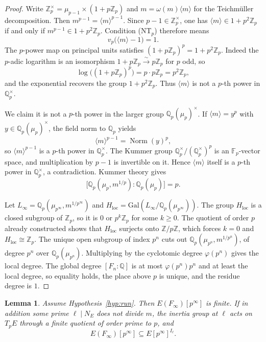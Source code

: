 \documentclass[11pt]{article}
\newtheorem{lemma}[theorem]{Lemma}
\theoremstyle{definition}
\theoremstyle{remark}
\newcommand{\Z}{\mathbb{Z}}
\newcommand{\Q}{\mathbb{Q}}
\newcommand{\F}{\mathbb{F}}
\newcommand{\Gal}{\mathrm{Gal}}
\newcommand{\Norm}{\operatorname{Norm}}
\begin{document}
\begin{proof}
Write \(\Z_p^\times=\mu_{p-1}\times(1+p\Z_p)\) and \(m=\omega(m)\langle m\rangle\) for the Teichm\"uller decomposition. Then \(m^{p-1}=\langle m\rangle^{p-1}\). Since \(p-1\in\Z_p^\times\), one has \(\langle m\rangle\in 1+p^2\Z_p\) if and only if \(m^{p-1}\in 1+p^2\Z_p\). Condition (NT\(_p\)) therefore means
\[
v_p\bigl(\langle m\rangle-1\bigr)=1.
\]
The \(p\)-power map on principal units satisfies \((1+p\Z_p)^p=1+p^2\Z_p\). Indeed the \(p\)-adic logarithm is an isomorphism \(1+p\Z_p\xrightarrow{\sim}p\Z_p\) for \(p\) odd, so
\[
\log\bigl((1+p\Z_p)^p\bigr)=p\cdot p\Z_p=p^2\Z_p,
\]
and the exponential recovers the group \(1+p^2\Z_p\). Thus \(\langle m\rangle\) is not a \(p\)-th power in \(\Q_p^\times\).

We claim it is not a \(p\)-th power in the larger group \(\Q_p(\mu_p)^\times\). If \(\langle m\rangle=y^p\) with \(y\in\Q_p(\mu_p)^\times\), the field norm to \(\Q_p\) yields
\[
\langle m\rangle^{p-1}=\Norm(y)^p,
\]
so \(\langle m\rangle^{p-1}\) is a \(p\)-th power in \(\Q_p^\times\). The Kummer group \(\Q_p^\times/(\Q_p^\times)^p\) is an \(\F_p\)-vector space, and multiplication by \(p-1\) is invertible on it. Hence \(\langle m\rangle\) itself is a \(p\)-th power in \(\Q_p^\times\), a contradiction. Kummer theory gives
\[
\bigl[\Q_p(\mu_p,m^{1/p}):\Q_p(\mu_p)\bigr]=p.
\]

Let \(L_\infty=\Q_p(\mu_{p^\infty},m^{1/p^\infty})\) and \(H_{\mathrm{loc}}=\Gal(L_\infty/\Q_p(\mu_{p^\infty}))\). The group \(H_{\mathrm{loc}}\) is a closed subgroup of \(\Z_p\), so it is \(0\) or \(p^k\Z_p\) for some \(k\ge 0\). The quotient of order \(p\) already constructed shows that \(H_{\mathrm{loc}}\) surjects onto \(\Z/p\Z\), which forces \(k=0\) and \(H_{\mathrm{loc}}\cong\Z_p\). The unique open subgroup of index \(p^n\) cuts out \(\Q_p(\mu_{p^n},m^{1/p^n})\), of degree \(p^n\) over \(\Q_p(\mu_{p^n})\). Multiplying by the cyclotomic degree \(\varphi(p^n)\) gives the local degree. The global degree \([F_n:\Q]\) is at most \(\varphi(p^n)p^n\) and at least the local degree, so equality holds, the place above \(p\) is unique, and the residue degree is \(1\).
\end{proof}

\begin{lemma}
\label{lem:disjoint}
Assume Hypothesis~\ref{hyp:run}. Then \(E(F_\infty)[p^\infty]\) is finite. If in addition some prime \(\ell\mid N_E\) does not divide \(m\), the inertia group at \(\ell\) acts on \(T_pE\) through a finite quotient of order prime to \(p\), and
\[
E(F_\infty)[p^\infty]
\subseteq
E[p^\infty]^{I_\ell}.
\]
\end{lemma}
\end{document}
